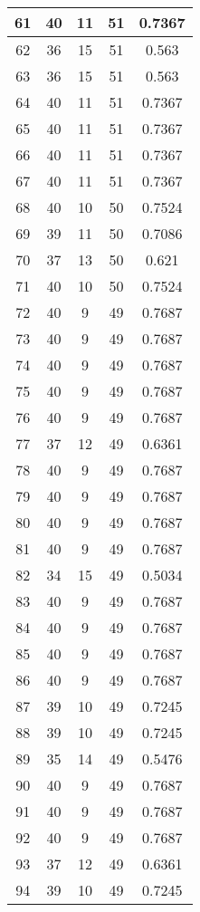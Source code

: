 \documentclass[letterpaper, 12pt]{article}
\begin{document}
\begin{longtable}{|c|c|c|c|c|}
\hline
61 & 40 & 11 & 51 & 0.7367 \\
\hline
62 & 36 & 15 & 51 & 0.563 \\
\hline
63 & 36 & 15 & 51 & 0.563 \\
\hline
64 & 40 & 11 & 51 & 0.7367 \\
\hline
65 & 40 & 11 & 51 & 0.7367 \\
\hline
66 & 40 & 11 & 51 & 0.7367 \\
\hline
67 & 40 & 11 & 51 & 0.7367 \\
\hline
68 & 40 & 10 & 50 & 0.7524 \\
\hline
69 & 39 & 11 & 50 & 0.7086 \\
\hline
70 & 37 & 13 & 50 & 0.621 \\
\hline
71 & 40 & 10 & 50 & 0.7524 \\
\hline
72 & 40 & 9 & 49 & 0.7687 \\
\hline
73 & 40 & 9 & 49 & 0.7687 \\
\hline
74 & 40 & 9 & 49 & 0.7687 \\
\hline
75 & 40 & 9 & 49 & 0.7687 \\
\hline
76 & 40 & 9 & 49 & 0.7687 \\
\hline
77 & 37 & 12 & 49 & 0.6361 \\
\hline
78 & 40 & 9 & 49 & 0.7687 \\
\hline
79 & 40 & 9 & 49 & 0.7687 \\
\hline
80 & 40 & 9 & 49 & 0.7687 \\
\hline
81 & 40 & 9 & 49 & 0.7687 \\
\hline
82 & 34 & 15 & 49 & 0.5034 \\
\hline
83 & 40 & 9 & 49 & 0.7687 \\
\hline
84 & 40 & 9 & 49 & 0.7687 \\
\hline
85 & 40 & 9 & 49 & 0.7687 \\
\hline
86 & 40 & 9 & 49 & 0.7687 \\
\hline
87 & 39 & 10 & 49 & 0.7245 \\
\hline
88 & 39 & 10 & 49 & 0.7245 \\
\hline
89 & 35 & 14 & 49 & 0.5476 \\
\hline
90 & 40 & 9 & 49 & 0.7687 \\
\hline
91 & 40 & 9 & 49 & 0.7687 \\
\hline
92 & 40 & 9 & 49 & 0.7687 \\
\hline
93 & 37 & 12 & 49 & 0.6361 \\
\hline
94 & 39 & 10 & 49 & 0.7245 \\
\hline

\end{longtable}
\end{document}
